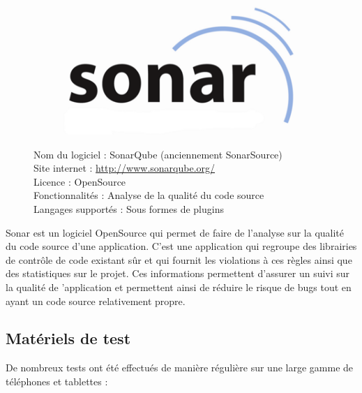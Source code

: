 \documentclass{report}
\begin{document}
\begin{figure}[h]
\begin{figure}
\includegraphics{images/sonar_logo}
\end{figure}
\noindent
Nom du logiciel : SonarQube (anciennement SonarSource)\\
Site internet : \url{http://www.sonarqube.org/}\\
Licence : OpenSource\\
Fonctionnalités : Analyse de la qualité du code source\\
Langages supportés : Sous formes de plugins\\
\bigskip
\end{figure}
\noindent
Sonar est un logiciel OpenSource qui permet de faire de l’analyse sur
la qualité du code source d’une application. C’est une application qui
regroupe des librairies de contrôle de code existant sûr et qui fournit
les violations à ces règles ainsi que des statistiques sur le projet.
Ces informations permettent d’assurer un suivi sur la qualité de
’application et permettent ainsi de réduire le risque de bugs tout en
ayant un code source relativement propre.

\subsection{Matériels de test}
\bigskip


De nombreux tests ont été effectués de manière régulière sur une large
gamme de téléphones et tablettes :
\end{document}
